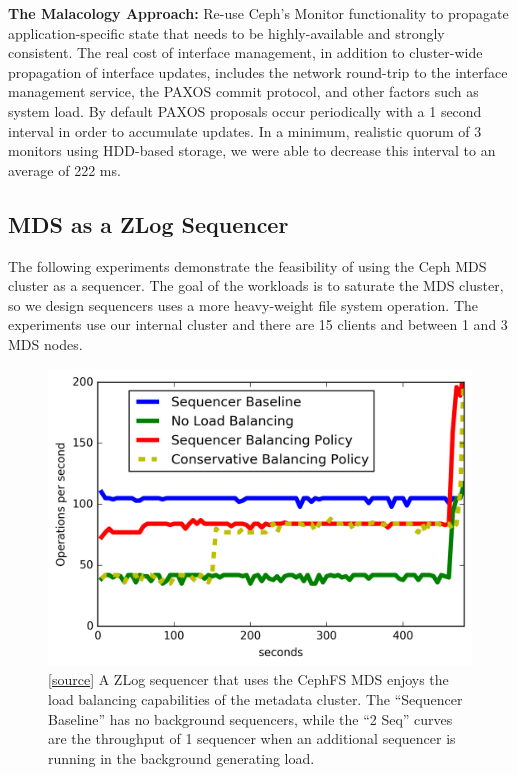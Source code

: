 \documentclass[10pt,twocolumn]{article}
\begin{document}
\textbf{The Malacology Approach:} Re-use Ceph's Monitor functionality to
propagate application-specific state that needs to be highly-available and
strongly consistent.  The real cost of interface management, in addition to
cluster-wide propagation of interface updates, includes the network round-trip
to the interface management service, the PAXOS commit protocol, and other
factors such as system load. By default PAXOS proposals occur periodically with
a 1 second interval in order to accumulate updates. In a minimum, realistic
quorum of 3 monitors using HDD-based storage, we were able to decrease this
interval to an average of 222 ms.

\subsection{MDS as a ZLog Sequencer}

The following experiments demonstrate the feasibility of using the Ceph MDS
cluster as a sequencer. The goal of the workloads is to saturate the MDS
cluster, so we design sequencers uses a more heavy-weight file system
operation. The experiments use our internal cluster and there are 15 clients
and between 1 and 3 MDS nodes. 

\begin{figure}[t!]
\centering
\includegraphics{figures/mantle-seq-thruput.png}
\caption{[\href{https://github.com/double-blind-submitter/osdi16}{source}] A
ZLog sequencer that uses the CephFS MDS enjoys the load balancing capabilities
of the metadata cluster. The ``Sequencer Baseline'' has no background
sequencers, while the ``2 Seq'' curves are the throughput of 1 sequencer when
an additional sequencer is running in the background generating
load.}\label{fig:mantle-seq-thruput}
\end{figure}
\end{document}
